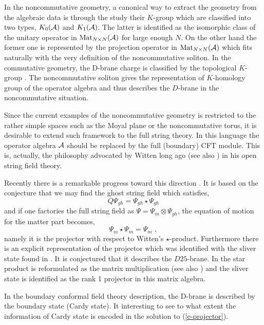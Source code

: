 \documentclass[a4paper,12pt]{article}
\begin{document}
In the noncommutative geometry, a canonical way to extract the geometry
from the algebraic data is through the study their $K$-group
\cite{r-Connes, r-WO} which are classified into
two types, $K_0(\cal A)$ and $K_1(\cal A)$.  The latter is
identified as the isomorphic class of the unitary operator in
$\mbox{Mat}_{N\times N}(\cal A)$ for large enough 
$N$.  On the other hand 
the former one is represented by the projection operator 
in $\mbox{Mat}_{N\times N}(\cal A)$
which fits naturally with the very definition 
of the noncommutative soliton.
In the commutative geometry, the D-brane charge is
classified by the topological $K$-group
\cite{r-Witten1, r-Horava}.  The noncommutative
soliton gives the representation of $K$-homology group of the
operator algebra and thus describes the $D$-brane
in the noncommutative situation\cite{r-Matsuo, r-HM}.

Since the current examples of the noncommutative geometry
is restricted to the rather simple spaces such as
the Moyal plane or the noncommutative torus, it is desirable
to extend such framework to the full string theory. 
In this language the operator algebra $\cal A$ should be
replaced by the full (boundary) CFT module.
This is, actually, the philosophy advocated by Witten
long ago \cite{r-Witten} (see also \cite{r-Witten2}) in his 
open string field theory.

Recently there is a remarkable progress toward this direction
\cite{r-RZ,r-KP, r-RSZ, r-RSZ1, r-RSZ2, r-GT}. It is based on the
conjecture that we may find the ghost string field which satisfies,
\begin{equation}
 Q\Psi_{gh}=\Psi_{gh}\star \Psi_{gh}
\end{equation}
and if one factories the full string field as
$\Psi=\Psi_{m}\otimes\Psi_{gh}$, the equation of
motion for the matter part becomes,
\begin{equation}\label{e-projector}
 \Psi_m\star \Psi_m = \Psi_m\,\,,
\end{equation}
namely it is the projector with respect to Witten's $\star$-product.
Furthermore there is an explicit representation of
the projector \cite{r-KP} which was identified with the 
sliver state found in \cite{r-RZ}.  It is conjectured that
it describes  the $D25$-brane. In \cite{r-RSZ2,r-GT} the
star product is reformulated as the matrix multiplication
(see also \cite{r-Witten}) and the sliver state is identified as the
rank 1 projector in this matrix algebra.

In the boundary conformal field theory description,
the D-brane is described by the boundary state (Cardy state).
It interesting to see to what extent the information of 
Cardy state is encoded in the solution to (\ref{e-projector}).
\end{document}
